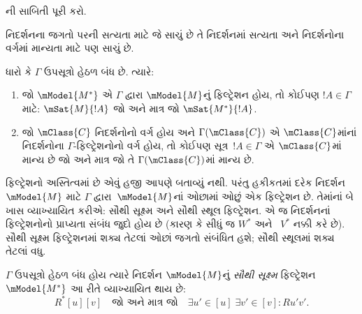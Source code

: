 \begin{prob}
  ની સાબિતી પૂરી કરો.
\end{prob}

નિદર્શનના જગતો પરની સત્યતા માટે જે સાચું છે તે નિદર્શનમાં સત્યતા
અને નિદર્શનોના વર્ગમાં માન્યતા માટે પણ સાચું છે.

\begin{cor}
  ધારો કે $\Gamma$ ઉપસૂત્રો હેઠળ બંધ છે. ત્યારે:
  \begin{enumerate}
  \item જો $\mModel{M^*}$ એ $\Gamma$ દ્વારા $\mModel{M}$નું
    ફિલ્ટ્રેશન હોય, તો કોઈપણ $!A \in \Gamma$ માટે:
    $\mSat{M}{!A}$ જો અને માત્ર જો $\mSat{M^*}{!A}$.
  \item જો $\mClass{C}$ નિદર્શનોનો વર્ગ હોય અને
    $\Gamma(\mClass{C})$ એ $\mClass{C}$માંનાં નિદર્શનોના
    $\Gamma$-ફિલ્ટ્રેશનોનો વર્ગ હોય, તો કોઈપણ
    સૂત્ર~$!A \in \Gamma$ એ $\mClass{C}$માં માન્ય છે
    જો અને માત્ર જો તે $\Gamma(\mClass{C})$માં માન્ય છે.
  \end{enumerate}
\end{cor}
\endgroup

\begingroup
\makeatletter{}\makeatother


\label{guunit:OLP-0454}


ફિલ્ટ્રેશનો અસ્તિત્વમાં છે એવું હજી આપણે બતાવ્યું નથી. પરંતુ હકીકતમાં
દરેક નિદર્શન $\mModel{M}$ માટે $\Gamma$ દ્વારા~$\mModel{M}$નાં
ઓછામાં ઓછું એક ફિલ્ટ્રેશન છે. તેમાંનાં બે ખાસ વ્યાખ્યાયિત કરીએ:
સૌથી સૂક્ષ્મ અને સૌથી
સ્થૂલ ફિલ્ટ્રેશન. એ જ નિદર્શનનાં ફિલ્ટ્રેશનોનો પ્રાપ્યતા સંબંધ જુદો
હોય છે (કારણ કે  સીધું જ $W^*$ અને
~$V^*$ નક્કી કરે છે). સૌથી સૂક્ષ્મ ફિલ્ટ્રેશનમાં શક્ય તેટલાં ઓછાં
જગતો સંબંધિત હશે; સૌથી સ્થૂલમાં શક્ય તેટલાં વધુ.


\begin{defn}
  $\Gamma$ ઉપસૂત્રો હેઠળ બંધ હોય ત્યારે નિદર્શન $\mModel{M}$નું
  \emph{સૌથી સૂક્ષ્મ} ફિલ્ટ્રેશન $\mModel{M^*}$ આ રીતે વ્યાખ્યાયિત
  થાય છે:
  \[
  R^*[u][v] \quad \text{જો અને માત્ર જો} \quad \exists u'\in [u] \;
  \exists v' \in [v] : Ru'v'.
  \]
\end{defn}

